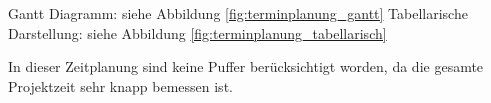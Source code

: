 Gantt Diagramm: siehe Abbildung \ref{fig:terminplanung_gantt} \newline
Tabellarische Darstellung: siehe Abbildung \ref{fig:terminplanung_tabellarisch}

In dieser Zeitplanung sind keine Puffer berücksichtigt worden, da die gesamte Projektzeit sehr knapp bemessen ist.